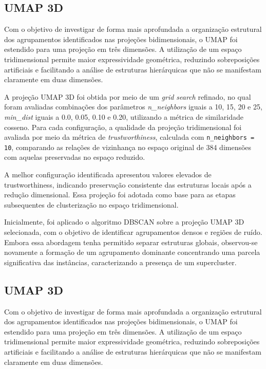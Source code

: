 \documentclass[12pt,a4paper]{article}
\begin{document}
\subsection{UMAP 3D}

Com o objetivo de investigar de forma mais aprofundada a organização estrutural dos agrupamentos identificados nas projeções bidimensionais, o UMAP foi estendido para uma projeção em três dimensões. A utilização de um espaço tridimensional permite maior expressividade geométrica, reduzindo sobreposições artificiais e facilitando a análise de estruturas hierárquicas que não se manifestam claramente em duas dimensões.

A projeção UMAP 3D foi obtida por meio de um \textit{grid search} refinado, no qual foram avaliadas combinações dos parâmetros \textit{n\_neighbors} iguais a 10, 15, 20 e 25, \textit{min\_dist} iguais a 0.0, 0.05, 0.10 e 0.20, utilizando a métrica de similaridade cosseno. Para cada configuração, a qualidade da projeção tridimensional foi avaliada por meio da métrica de \textit{trustworthiness}, calculada com \texttt{n\_neighbors = 10}, comparando as relações de vizinhança no espaço original de 384 dimensões com aquelas preservadas no espaço reduzido.

A melhor configuração identificada apresentou valores elevados de trustworthiness, indicando preservação consistente das estruturas locais após a redução dimensional. Essa projeção foi adotada como base para as etapas subsequentes de clusterização no espaço tridimensional.

Inicialmente, foi aplicado o algoritmo DBSCAN sobre a projeção UMAP 3D selecionada, com o objetivo de identificar agrupamentos densos e regiões de ruído. Embora essa abordagem tenha permitido separar estruturas globais, observou-se novamente a formação de um agrupamento dominante concentrando uma parcela significativa das instâncias, caracterizando a presença de um supercluster.
\subsection{UMAP 3D}

Com o objetivo de investigar de forma mais aprofundada a organização estrutural dos agrupamentos identificados nas projeções bidimensionais, o UMAP foi estendido para uma projeção em três dimensões. A utilização de um espaço tridimensional permite maior expressividade geométrica, reduzindo sobreposições artificiais e facilitando a análise de estruturas hierárquicas que não se manifestam claramente em duas dimensões.
\end{document}
